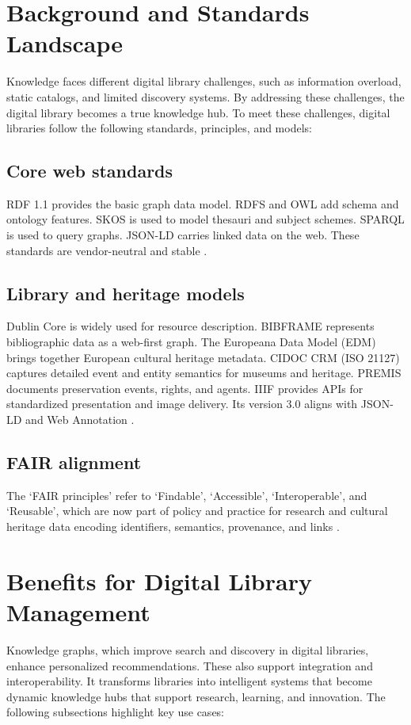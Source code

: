 \documentclass[12pt,a4paper]{article}
\begin{document}
\section{Background and Standards Landscape}
Knowledge faces different digital library challenges, such as information overload, static catalogs, and limited discovery systems. By addressing these challenges, the digital library becomes a true knowledge hub. To meet these challenges, digital libraries follow the following standards, principles, and models:

\subsection{Core web standards}
RDF 1.1 provides the basic graph data model. RDFS and OWL add schema and ontology features. SKOS is used to model thesauri and subject schemes. SPARQL is used to query graphs. JSON-LD carries linked data on the web. These standards are vendor-neutral and stable \cite{zhang2024review}.

\subsection{Library and heritage models}
Dublin Core is widely used for resource description. BIBFRAME represents bibliographic data as a web-first graph. The Europeana Data Model (EDM) brings together European cultural heritage metadata. CIDOC CRM (ISO 21127) captures detailed event and entity semantics for museums and heritage. PREMIS documents preservation events, rights, and agents. IIIF provides APIs for standardized presentation and image delivery. Its version 3.0 aligns with JSON-LD and Web Annotation \cite{wang2019kgat}.

\subsection{FAIR alignment}
The ‘FAIR principles’ refer to ‘Findable’, ‘Accessible’, ‘Interoperable’, and ‘Reusable', which are now part of policy and practice for research and cultural heritage data encoding identifiers, semantics, provenance, and links \cite{wilkinson2016fair}.

\section{Benefits for Digital Library Management}
Knowledge graphs, which improve search and discovery in digital libraries, enhance personalized recommendations. These also support integration and interoperability. It transforms libraries into intelligent systems that become dynamic knowledge hubs that support research, learning, and innovation. The following subsections highlight key use cases:
\end{document}
